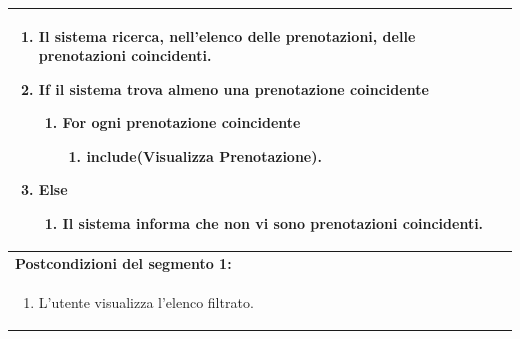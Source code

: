 \documentclass{article}
\begin{document}
\begin{table}[H]
\begin{tabular}{|p{\linewidth}|}
                        \begin{enumerate}
                            \item Il sistema ricerca, nell'elenco delle prenotazioni, delle prenotazioni coincidenti.
                            \item \textbf{If} il sistema trova almeno una prenotazione coincidente
                            \begin{enumerate}
                                \item \textbf{For} ogni prenotazione coincidente
                                \begin{enumerate}
                                    \item \textbf{include}(Visualizza Prenotazione).
                                \end{enumerate}
                            \end{enumerate}
                            \item \textbf{Else}
                            \begin{enumerate}
                                \item Il sistema informa che non vi sono prenotazioni coincidenti.
                            \end{enumerate}
                        \end{enumerate} \\
                        \hline
                        \cellcolor{gray!20}
                        \textbf{Postcondizioni del segmento 1:} \\
                        \cellcolor{gray!20}
                        \begin{minipage}{\linewidth}
                            \begin{enumerate}
                                \item L'utente visualizza l'elenco filtrato.
                            \end{enumerate}
                        \end{minipage} \\
                        \hline
                    \end{tabular}
                \end{table}
\end{document}
